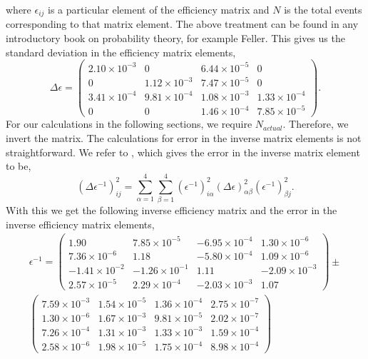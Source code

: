 where $\epsilon_{ij}$ is a particular element of the efficiency matrix and $N$ is the total events corresponding to that matrix element. The above treatment can be found in any introductory book on probability theory, for example Feller\cite{feller}. This gives us the standard deviation in the efficiency matrix elements,
\begin{equation}
    \Delta \epsilon = 
    \begin{pmatrix}
        2.10 \times 10^{-3} & 0 & 6.44 \times 10^{-5} & 0 \\
        0 & 1.12 \times 10^{-3} & 7.47 \times 10^{-5} & 0 \\
        3.41 \times 10^{-4} & 9.81 \times 10^{-4} & 1.08 \times 10^{-3} & 1.33 \times 10^{-4} \\
        0 & 0 & 1.46 \times 10^{-4} & 7.85 \times 10^{-5}
    \end{pmatrix}.
\end{equation}
For our calculations in the following sections, we require $N_{actual}$. Therefore, we invert the matrix. The calculations for error in the inverse matrix elements is not straightforward. We refer to \cite{lefebvre}, which gives the error in the inverse matrix element to be,
\begin{equation}
    (\Delta \epsilon^{-1})^2_{ij} = \sum_{\alpha = 1}^4 \sum_{\beta = 1}^4 (\epsilon^{-1})^2_{i\alpha}(\Delta \epsilon)^2_{\alpha\beta} (\epsilon^{-1})^2_{\beta j}.
\end{equation}
With this we get the following inverse efficiency matrix and the error in the inverse efficiency matrix elements,
\begin{equation}
\begin{split}
    \epsilon^{-1} = 
    \begin{pmatrix}
        1.90 & 7.85 \times 10^{-5} & -6.95 \times 10^{-4} & 1.30 \times 10^{-6} \\
        7.36 \times 10^{-6} & 1.18 & -5.80 \times 10^{-4} & 1.09 \times 10^{-6} \\
        -1.41 \times 10^{-2} & -1.26 \times 10^{-1} & 1.11 & -2.09 \times 10^{-3} \\
        2.57 \times 10^{-5} & 2.29 \times 10^{-4} & -2.03 \times 10^{-3} & 1.07
    \end{pmatrix}
    \pm \\
    \begin{pmatrix}
        7.59 \times 10^{-3} & 1.54 \times 10^{-5} & 1.36 \times 10^{-4} & 2.75 \times 10^{-7} \\
        1.30 \times 10^{-6} & 1.67 \times 10^{-3} & 9.81 \times 10^{-5} & 2.02 \times 10^{-7} \\
        7.26 \times 10^{-4} & 1.31 \times 10^{-3} & 1.33 \times 10^{-3} & 1.59 \times 10^{-4} \\
        2.58 \times 10^{-6} & 1.98 \times 10^{-5} & 1.75 \times 10^{-4} & 8.98 \times 10^{-4}
    \end{pmatrix}
\end{split}
\end{equation}

